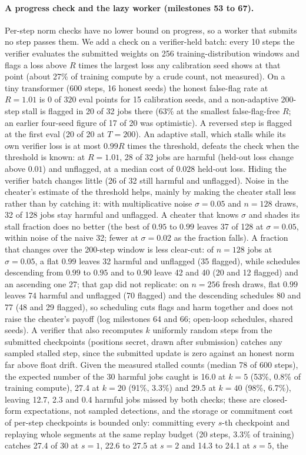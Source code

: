 \documentclass[sigconf,anonymous]{acmart}
\begin{document}
\paragraph{A progress check and the lazy worker (milestones 53 to 67).} Per-step norm checks have no lower bound on progress, so a worker that submits no step passes them. We add a check on a verifier-held batch: every 10 steps the verifier evaluates the submitted weights on 256 training-distribution windows and flags a loss above $R$ times the largest loss any calibration seed shows at that point (about 27\% of training compute by a crude count, not measured). On a tiny transformer (600 steps, 16 honest seeds) the honest false-flag rate at $R=1.01$ is $0$ of $320$ eval points for 15 calibration seeds, and a non-adaptive 200-step stall is flagged in 20 of 32 jobs there (63\% at the smallest false-flag-free $R$; an earlier four-seed figure of 17 of 20 was optimistic). A reversed step is flagged at the first eval (20 of 20 at $T=200$). An adaptive stall, which stalls while its own verifier loss is at most $0.99R$ times the threshold, defeats the check when the threshold is known: at $R=1.01$, 28 of 32 jobs are harmful (held-out loss change above $0.01$) and unflagged, at a median cost of $0.028$ held-out loss. Hiding the verifier batch changes little (26 of 32 still harmful and unflagged). Noise in the cheater's estimate of the threshold helps, mainly by making the cheater stall less rather than by catching it: with multiplicative noise $\sigma=0.05$ and $n=128$ draws, 32 of 128 jobs stay harmful and unflagged. A cheater that knows $\sigma$ and shades its stall fraction does no better (the best of $0.95$ to $0.99$ leaves 37 of 128 at $\sigma=0.05$, within noise of the naive 32; fewer at $\sigma=0.02$ as the fraction falls). A fraction that changes over the 200-step window is less clear-cut: of $n=128$ jobs at $\sigma=0.05$, a flat $0.99$ leaves 32 harmful and unflagged (35 flagged), while schedules descending from $0.99$ to $0.95$ and to $0.90$ leave 42 and 40 (20 and 12 flagged) and an ascending one 27; that gap did not replicate: on $n=256$ fresh draws, flat $0.99$ leaves 74 harmful and unflagged (70 flagged) and the descending schedules 80 and 77 (48 and 29 flagged), so scheduling cuts flags and harm together and does not raise the cheater's payoff (log milestones 64 and 66; open-loop schedules, shared seeds). A verifier that also recomputes $k$ uniformly random steps from the submitted checkpoints (positions secret, drawn after submission) catches any sampled stalled step, since the submitted update is zero against an honest norm far above float drift. Given the measured stalled counts (median 78 of 600 steps), the expected number of the 30 harmful jobs caught is 16.0 at $k=5$ (53\%, 0.8\% of training compute), 27.4 at $k=20$ (91\%, 3.3\%) and 29.5 at $k=40$ (98\%, 6.7\%), leaving 12.7, 2.3 and 0.4 harmful jobs missed by both checks; these are closed-form expectations, not sampled detections, and the storage or commitment cost of per-step checkpoints is bounded only: committing every $s$-th checkpoint and replaying whole segments at the same replay budget (20 steps, 3.3\% of training) catches 27.4 of 30 at $s=1$, 22.6 to 27.5 at $s=2$ and 14.3 to 24.1 at $s=5$, the 
\end{document}
